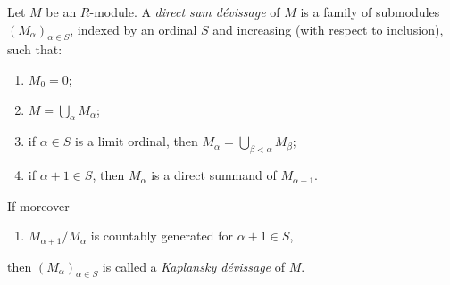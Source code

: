 \begin{definition}
\label{definition-devissage}
Let $M$ be an $R$-module.  A {\it direct sum d\'evissage} of $M$ is a family
of submodules $(M_{\alpha})_{\alpha \in S}$, indexed by an ordinal $S$ and
increasing (with respect to inclusion), such that:
\begin{enumerate}
\item[(0)] $M_0 = 0$;
\item[(1)] $M = \bigcup_{\alpha} M_{\alpha}$;
\item[(2)] if $\alpha \in S$ is a limit ordinal, then $M_{\alpha} =
\bigcup_{\beta < \alpha} M_{\beta}$;
\item[(3)] if $\alpha + 1 \in S$, then $M_{\alpha}$ is a direct summand of
$M_{\alpha + 1}$.
\end{enumerate}
If moreover
\begin{enumerate}
\item[(4)] $M_{\alpha + 1}/M_{\alpha}$ is countably generated for
$\alpha + 1 \in S$,
\end{enumerate}
then $(M_{\alpha})_{\alpha \in S}$ is called a {\it Kaplansky d\'evissage}
of $M$.
\end{definition}